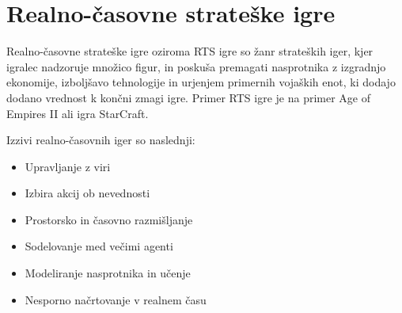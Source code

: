 \documentclass[a4paper, 12pt]{book}
\begin{document}
\chapter{Realno-časovne strateške igre}
\label{chrts}

Realno-časovne strateške igre oziroma RTS igre so žanr strateških iger, kjer igralec nadzoruje množico figur, in poskuša premagati nasprotnika z izgradnjo ekonomije, izboljšavo tehnologije in urjenjem primernih vojaških enot, ki dodajo dodano vrednost k končni zmagi igre. Primer RTS igre je na primer Age of Empires II ali igra StarCraft. 

Izzivi realno-časovnih iger so naslednji:
\begin{itemize}
	\item Upravljanje z viri
	\item Izbira akcij ob nevednosti
	\item Prostorsko in časovno razmišljanje
	\item Sodelovanje med večimi agenti
	\item Modeliranje nasprotnika in učenje
	\item Nesporno načrtovanje v realnem času
\end{itemize}
\end{document}

